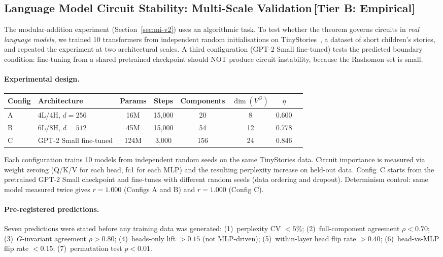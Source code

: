 \documentclass[11pt,a4paper]{article}
\begin{document}
\subsection{Language Model Circuit Stability: Multi-Scale Validation\,\textnormal{\normalsize[Tier B: Empirical]}}
\label{sec:tinystories}

The modular-addition experiment (Section~\ref{sec:mi-v2}) uses an algorithmic task.  To test whether the theorem governs circuits in \emph{real language models}, we trained 10 transformers from independent random initialisations on TinyStories~\cite{eldan2023tinystories}, a dataset of short children's stories, and repeated the experiment at two architectural scales.  A third configuration (GPT-2 Small fine-tuned) tests the predicted boundary condition: fine-tuning from a shared pretrained checkpoint should NOT produce circuit instability, because the Rashomon set is small.

\paragraph{Experimental design.}
\begin{center}
\small
\begin{tabular}{@{}llcccccc@{}}
\toprule
Config & Architecture & Params & Steps & Components & $\dim(V^G)$ & $\eta$ \\
\midrule
A & 4L/4H, $d = 256$ & 16M & 15{,}000 & 20 & 8 & 0.600 \\
B & 6L/8H, $d = 512$ & 45M & 15{,}000 & 54 & 12 & 0.778 \\
C & GPT-2 Small fine-tuned & 124M & 3{,}000 & 156 & 24 & 0.846 \\
\bottomrule
\end{tabular}
\end{center}
Each configuration trains 10 models from independent random seeds on the same TinyStories data.  Circuit importance is measured via weight zeroing (Q/K/V for each head, fc1 for each MLP) and the resulting perplexity increase on held-out data.  Config~C starts from the pretrained GPT-2 Small checkpoint and fine-tunes with different random seeds (data ordering and dropout).  Determinism control: same model measured twice gives $r = 1.000$ (Configs A and B) and $r = 1.000$ (Config C).

\paragraph{Pre-registered predictions.}
Seven predictions were stated before any training data was generated:
(1)~perplexity CV $< 5\%$;
(2)~full-component agreement $\rho < 0.70$;
(3)~$G$-invariant agreement $\rho > 0.80$;
(4)~heads-only lift $> 0.15$ (not MLP-driven);
(5)~within-layer head flip rate $> 0.40$;
(6)~head-vs-MLP flip rate $< 0.15$;
(7)~permutation test $p < 0.01$.
\end{document}
